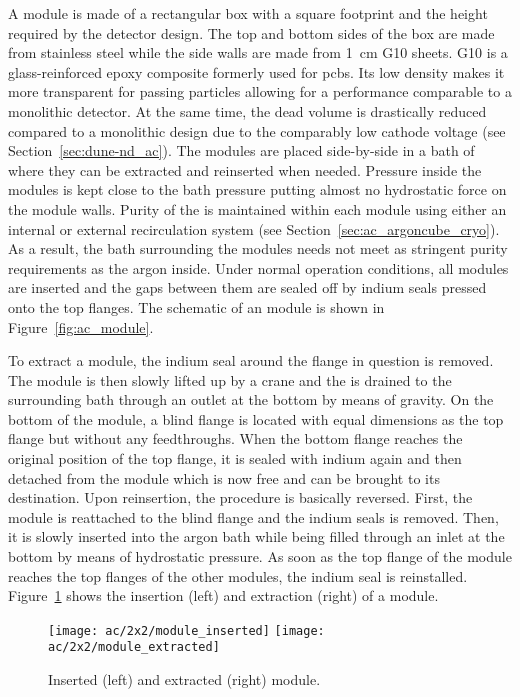 A module is made of a rectangular box with a square footprint and the height required by the detector design.
The top and bottom sides of the box are made from stainless steel while the side walls are made from \SI{1}{\centi\metre} G10 sheets.
G10 is a glass-reinforced epoxy composite formerly used for \glspl{pcb}.
Its low density makes it more transparent for passing particles allowing for a performance comparable to a monolithic detector.
At the same time, the dead volume is drastically reduced compared to a monolithic design due to the comparably low cathode voltage (see Section~\ref{sec:dune-nd_ac}).
The modules are placed side-by-side in a bath of \lar{} where they can be extracted and reinserted when needed.
Pressure inside the modules is kept close to the bath pressure putting almost no hydrostatic force on the module walls.
Purity of the \lar{} is maintained within each module using either an internal or external recirculation system (see Section~\ref{sec:ac_argoncube_cryo}).
As a result, the bath surrounding the modules needs not meet as stringent purity requirements as the argon inside.
Under normal operation conditions, all modules are inserted and the gaps between them are sealed off by indium seals pressed onto the top flanges.
The schematic of an \AC{} module is shown in Figure~\ref{fig:ac_module}.

To extract a module, the indium seal around the flange in question is removed.
The module is then slowly lifted up by a crane and the \lar{} is drained to the surrounding bath through an outlet at the bottom by means of gravity.
On the bottom of the module, a blind flange is located with equal dimensions as the top flange but without any feedthroughs.
When the bottom flange reaches the original position of the top flange, it is sealed with indium again and then detached from the module which is now free and can be brought to its destination.
Upon reinsertion, the procedure is basically reversed.
First, the module is reattached to the blind flange and the indium seals is removed.
Then, it is slowly inserted into the argon bath while being filled through an inlet at the bottom by means of hydrostatic pressure.
As soon as the top flange of the module reaches the top flanges of the other modules, the indium seal is reinstalled.
Figure~\ref{fig:ac_module-ins-ext} shows the insertion (left) and extraction (right) of a module.

\begin{figure}[htb]
	\centering
	\texttt{[image: ac/2x2/module\_inserted]}
	\texttt{[image: ac/2x2/module\_extracted]}
	\caption{Inserted (left) and extracted (right) module.}
	\label{fig:ac_module-ins-ext}
\end{figure}

